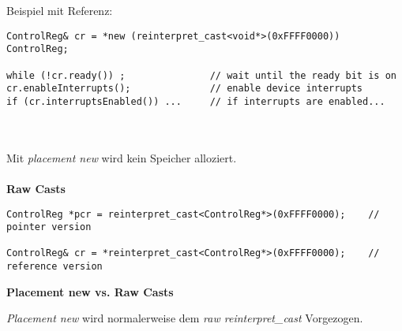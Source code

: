 Beispiel mit Referenz:
\begin{lstlisting}
ControlReg& cr = *new (reinterpret_cast<void*>(0xFFFF0000)) ControlReg;

while (!cr.ready()) ; 				// wait until the ready bit is on
cr.enableInterrupts(); 				// enable device interrupts
if (cr.interruptsEnabled()) ... 	// if interrupts are enabled...
\end{lstlisting}
\hspace*{\fill} \\\\
Mit \textit{placement new} wird kein Speicher alloziert.\\ \\

\textbf{Raw Casts}
\begin{lstlisting}
ControlReg *pcr = reinterpret_cast<ControlReg*>(0xFFFF0000);	// pointer version

ControlReg& cr = *reinterpret_cast<ControlReg*>(0xFFFF0000);	// reference version
\end{lstlisting}


\textbf{Placement new vs. Raw Casts}


\textit{Placement new} wird normalerweise dem \textit{ raw reinterpret_cast} Vorgezogen.

